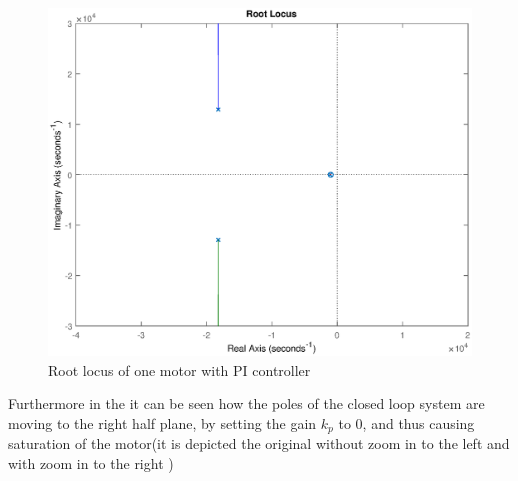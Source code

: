 \begin{figure}[H]
	\includegraphics[width=0.9\linewidth]{figures/pid_rootlocus}
	\caption{Root locus of one motor with PI controller}
	\label{fig:rlocus33}
\end{figure}
Furthermore in the   it can be seen how the poles of the closed loop system are moving to the right half plane, by setting the gain $k_{p}$ to 0, and thus causing saturation of the motor(it is depicted the original without zoom in to the left and with zoom in to the right )
